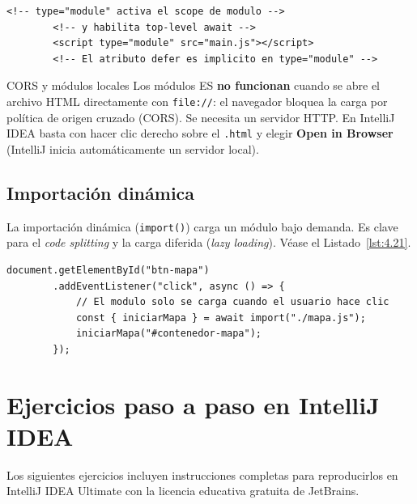 \documentclass[11pt,a4paper,openany]{book}
\begin{document}
	\begin{lstlisting}[style=html,numbers=none,caption={Usar módulos en HTML},
		label=lst:4.20html]
		<!-- type="module" activa el scope de modulo -->
		<!-- y habilita top-level await -->
		<script type="module" src="main.js"></script>
		<!-- El atributo defer es implicito en type="module" -->
	\end{lstlisting}
	
	\begin{cajaadvertencia}{CORS y módulos locales}
		Los módulos ES \textbf{no funcionan} cuando se abre el archivo
		HTML directamente con \texttt{file://}: el navegador bloquea la
		carga por política de origen cruzado (CORS). Se necesita un
		servidor HTTP. En IntelliJ IDEA basta con hacer clic derecho
		sobre el \texttt{.html} y elegir \textbf{Open in Browser}
		(IntelliJ inicia automáticamente un servidor local).
	\end{cajaadvertencia}
	
	\subsection{Importación dinámica}
	\label{sub:4.dynimport}
	
	La importación dinámica (\texttt{import()}) carga un módulo
	bajo demanda. Es clave para el \emph{code splitting} y la
	carga diferida (\emph{lazy loading}). Véase el
	Listado~\ref{lst:4.21}.
	
	\begin{lstlisting}[style=js,numbers=none,caption={Importación dinámica bajo demanda},
		label=lst:4.21]
		document.getElementById("btn-mapa")
		.addEventListener("click", async () => {
			// El modulo solo se carga cuando el usuario hace clic
			const { iniciarMapa } = await import("./mapa.js");
			iniciarMapa("#contenedor-mapa");
		});
	\end{lstlisting}
	
	\section{Ejercicios paso a paso en IntelliJ IDEA}
	\label{sec:4.ejercicios}
	
	Los siguientes ejercicios incluyen instrucciones completas para
	reproducirlos en IntelliJ IDEA Ultimate con la licencia educativa
	gratuita de JetBrains.
	
\end{document}
